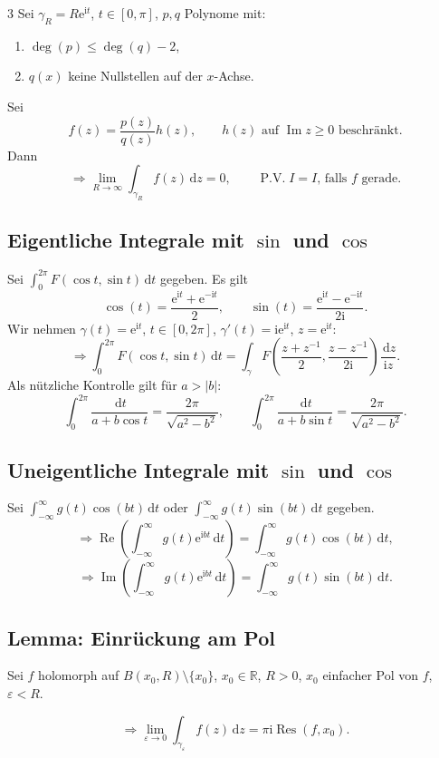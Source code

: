 \documentclass[a4paper,landscape]{article}
\newcommand{\R}{\mathbb R}
\newcommand{\dd}{\,\mathrm d}
\newcommand{\ee}{\mathrm e}
\newcommand{\ii}{\mathrm i}
\DeclareMathOperator{\Res}{Res}
\DeclareMathOperator{\PV}{P.V.}
\begin{document}
\begin{multicols*}{3}
Sei $\gamma_R=R\ee^{\ii t}$, $t\in[0,\pi]$, $p,q$ Polynome mit:
\begin{enumerate}
\item $\deg(p)\le \deg(q)-2$,
\item $q(x)$ keine Nullstellen auf der $x$-Achse.
\end{enumerate}
Sei
\[
f(z)=\frac{p(z)}{q(z)}h(z),\qquad h(z)\text{ auf }\operatorname{Im}z\ge0\text{ beschränkt}.
\]
Dann
\[
\Rightarrow \lim_{R\to\infty}\int_{\gamma_R}f(z)\dd z=0,
\qquad \PV I=I\text{, falls }f\text{ gerade}.
\]

\subsection*{Eigentliche Integrale mit $\sin$ und $\cos$}
Sei $\displaystyle\int_0^{2\pi}F(\cos t,\sin t)\dd t$ gegeben. Es gilt
\[
\cos(t)=\frac{\ee^{\ii t}+\ee^{-\ii t}}{2},\qquad
\sin(t)=\frac{\ee^{\ii t}-\ee^{-\ii t}}{2\ii}.
\]
Wir nehmen $\gamma(t)=\ee^{\ii t}$, $t\in[0,2\pi]$, $\gamma'(t)=\ii\ee^{\ii t}$, $z=\ee^{\ii t}$:
\[
\Rightarrow \int_0^{2\pi}F(\cos t,\sin t)\dd t
=\int_\gamma F\left(\frac{z+z^{-1}}{2},\frac{z-z^{-1}}{2\ii}\right)\frac{\dd z}{\ii z}.
\]
Als nützliche Kontrolle gilt für $a>|b|$:
\[
\int_0^{2\pi}\frac{\dd t}{a+b\cos t}
=\frac{2\pi}{\sqrt{a^2-b^2}},
\qquad
\int_0^{2\pi}\frac{\dd t}{a+b\sin t}
=\frac{2\pi}{\sqrt{a^2-b^2}}.
\]

\subsection*{Uneigentliche Integrale mit $\sin$ und $\cos$}
Sei $\displaystyle\int_{-\infty}^{\infty}g(t)\cos(bt)\dd t$ oder $\displaystyle\int_{-\infty}^{\infty}g(t)\sin(bt)\dd t$ gegeben.
\[
\Rightarrow \operatorname{Re}\left(\int_{-\infty}^{\infty}g(t)\ee^{\ii bt}\dd t\right)
=\int_{-\infty}^{\infty}g(t)\cos(bt)\dd t,
\]
\[
\Rightarrow \operatorname{Im}\left(\int_{-\infty}^{\infty}g(t)\ee^{\ii bt}\dd t\right)
=\int_{-\infty}^{\infty}g(t)\sin(bt)\dd t.
\]

\subsection*{Lemma: Einrückung am Pol}
Sei $f$ holomorph auf $B(x_0,R)\setminus\{x_0\}$, $x_0\in\R$, $R>0$, $x_0$ einfacher Pol von $f$, $\varepsilon<R$.
\begin{center}
\end{center}
\[
\Rightarrow \lim_{\varepsilon\to0}\int_{\gamma_\varepsilon}f(z)\dd z=\pi\ii\Res(f,x_0).
\]


\end{multicols*}
\end{document}
